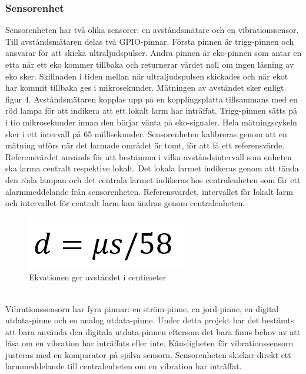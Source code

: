 \documentclass{article}
\begin{document}
\subsubsection{Sensorenhet}
Sensorenheten har två olika sensorer: en avståndsmätare och en vibrationssensor. 
Till avståndsmätaren delas två GPIO-pinnar. 
Första pinnen är trigg-pinnen och ansvarar för att skicka ultraljudspulser. 
Andra pinnen är eko-pinnen som antar en etta när ett eko kommer tillbaka och returnerar värdet noll om ingen läsning av eko sker. 
Skillnaden i tiden mellan när ultraljudspulsen skickades och när ekot har kommit tillbaka ges i mikrosekunder. 
Mätningen av avståndet sker enligt figur 4. 
Avståndsmätaren kopplas upp på en kopplingsplatta tillsammans med en röd lampa för att indikera att ett lokalt larm har inträffat. 
Trigg-pinnen sätts på i tio mikrosekunder innan den börjar vänta på eko-signaler. 
Hela mätningscykeln sker i ett intervall på 65 millisekunder. 
Sensorenheten kalibreras genom att en mätning utförs när det larmade området är tomt, för att få ett referensvärde. Referensvärdet används för att bestämma i vilka avståndsintervall som enheten ska larma centralt respektive lokalt. 
Det lokala larmet indikeras genom att tända den röda lampan och det centrala larmet indikeras hos centralenheten som får ett alarmmeddelande från sensorenheten. 
Referensvärdet, intervallet för lokalt larm och intervallet för centralt larm kan ändras genom centralenheten.
\begin{figure}[h]
    \centering
    \includegraphics[scale=0.5]{Projektrapport/ekvation.png}
    \caption {Ekvationen ger avståndet i centimeter }
    \label{fig:drawing}
\end{figure}
\\
Vibrationssensorn har fyra pinnar: en ström-pinne, en jord-pinne, en digital utdata-pinne och en analog utdata-pinne. 
Under detta projekt har det bestämts att bara använda den digitala utdata-pinnen eftersom det bara finns behov av att läsa om en vibration har inträffats eller inte.
Känsligheten för vibrationssensorn justeras med en komparator på själva sensorn. 
Sensorenheten skickar direkt ett larmmeddelande till centralenheten om en vibration har inträffat.
\end{document}
